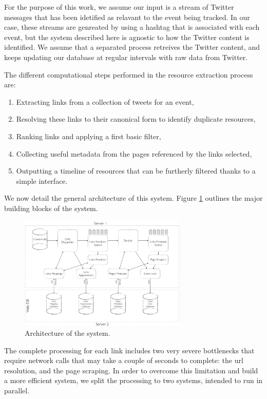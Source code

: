 \documentclass{sig-alternate}
\begin{document}
For the purpose of this work, we assume our input is a stream of Twitter messages that has been idetified as relavant to the event being tracked. In our case, these streams are genreated by using a hashtag that is associated with each event, but the system described here is agnostic to how the Twitter content is identified. We assume that a separated process retreives the Twitter content, and keeps updating our database at regular intervals with raw data from Twitter.


The different computational steps performed in the resource extraction process are:
\begin{enumerate}
 \item Extracting links from a collection of tweets for an event,
 \item Resolving these links to their canonical form to identify duplicate resources,
 \item Ranking links and applying a first basic filter,
 \item Collecting useful metadata from the pages referenced by the links selected,
 \item Outputting a timeline of resources that can be furtherly filtered thanks to a simple interface.
\end{enumerate}

We now detail the general architecture of this system. Figure \ref{fig:architecture} outlines the major building blocks of the system.
\begin{figure}[htbp]
  \centering
  \includegraphics[width=8cm]{Figures/links_processing_architecture.png}
  \caption{Architecture of the system.}
  \label{fig:architecture}
\end{figure}

The complete processing for each link includes two very severe bottlenecks that require network calls that may take a couple of seconds to complete: the url resolution, and the page scraping. In order to overcome this limitation and build a more efficient system, we split the processing to two systems, intended to run in parallel.
\end{document}

